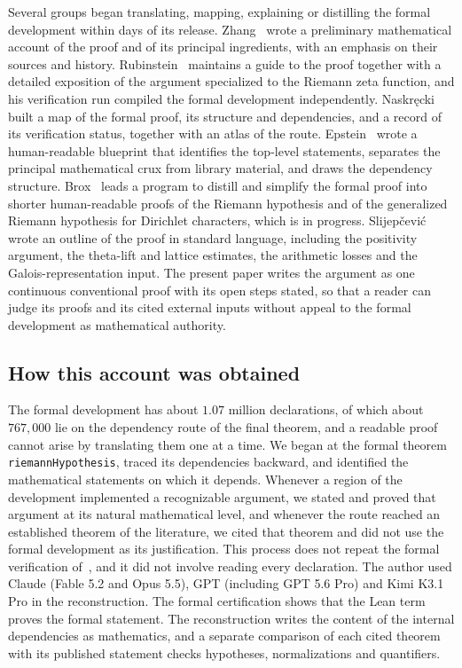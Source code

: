 Several groups began translating, mapping, explaining or distilling the formal development within days of its release. Zhang~\cite{zhang} wrote a preliminary mathematical account of the proof and of its principal ingredients, with an emphasis on their sources and history. Rubinstein~\cite{rubinsteinpage,rubinsteinzeta} maintains a guide to the proof together with a detailed exposition of the argument specialized to the Riemann zeta function, and his verification run compiled the formal development independently. Naskręcki~\cite{naskrecki} built a map of the formal proof, its structure and dependencies, and a record of its verification status, together with an atlas of the route. Epstein~\cite{epstein} wrote a human-readable blueprint that identifies the top-level statements, separates the principal mathematical crux from library material, and draws the dependency structure. Brox~\cite{brox} leads a program to distill and simplify the formal proof into shorter human-readable proofs of the Riemann hypothesis and of the generalized Riemann hypothesis for Dirichlet characters, which is in progress. Slijepčević~\cite{slijepcevic} wrote an outline of the proof in standard language, including the positivity argument, the theta-lift and lattice estimates, the arithmetic losses and the Galois-representation input. The present paper writes the argument as one continuous conventional proof with its open steps stated, so that a reader can judge its proofs and its cited external inputs without appeal to the formal development as mathematical authority.

\subsection{How this account was obtained}

The formal development has about $1.07$ million declarations, of which about $767{,}000$ lie on the dependency route of the final theorem, and a readable proof cannot arise by translating them one at a time. We began at the formal theorem \texttt{riemannHypothesis}, traced its dependencies backward, and identified the mathematical statements on which it depends. Whenever a region of the development implemented a recognizable argument, we stated and proved that argument at its natural mathematical level, and whenever the route reached an established theorem of the literature, we cited that theorem and did not use the formal development as its justification. This process does not repeat the formal verification of~\cite{leanstatement}, and it did not involve reading every declaration. The author used Claude (Fable 5.2 and Opus 5.5), GPT (including GPT 5.6 Pro) and Kimi K3.1 Pro in the reconstruction. The formal certification shows that the Lean term proves the formal statement. The reconstruction writes the content of the internal dependencies as mathematics, and a separate comparison of each cited theorem with its published statement checks hypotheses, normalizations and quantifiers.

